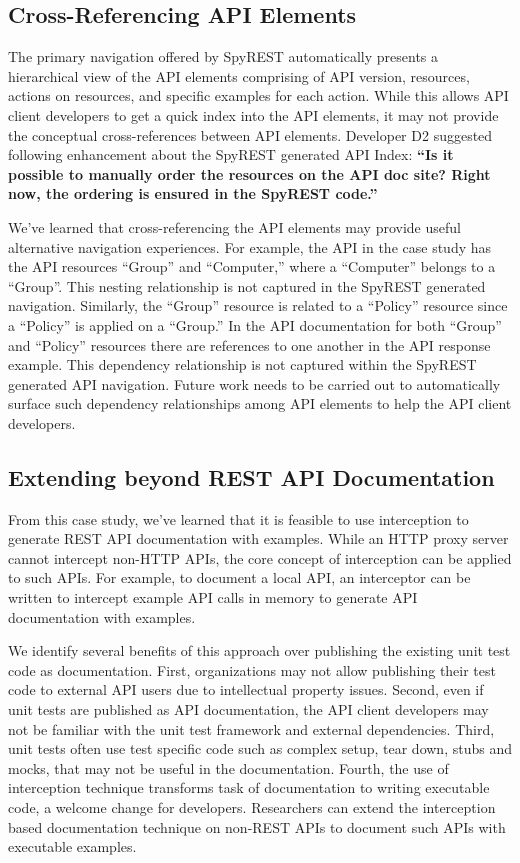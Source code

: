 \subsection{Cross-Referencing API Elements}
The primary navigation offered by SpyREST automatically presents a hierarchical view of the API elements comprising of API version, resources, actions on resources, and specific examples for each action. While this allows API client developers to get a quick index into the API elements, it may not provide the conceptual cross-references between API elements. Developer D2 suggested following enhancement about the SpyREST generated API Index: \textbf{``Is it possible to manually order the resources on the API doc site? Right now, the ordering is ensured in the SpyREST code.''}

We've learned that cross-referencing the API elements may provide useful alternative navigation experiences. For example, the API in the case study has the API resources ``Group'' and ``Computer,'' where a ``Computer'' belongs to a ``Group''. This nesting relationship is not captured in the SpyREST generated navigation. Similarly, the ``Group'' resource is related to a ``Policy'' resource since a ``Policy'' is applied on a ``Group.'' In the API documentation for both ``Group'' and ``Policy'' resources there are references to one another in the API response example. This dependency relationship is not captured within the SpyREST generated API navigation. Future work needs to be carried out to automatically surface such dependency relationships among API elements to help the API client developers.


\subsection{Extending beyond REST API Documentation}
From this case study, we've learned that it is feasible to use interception to generate REST API documentation with examples. While an HTTP proxy server cannot intercept non-HTTP APIs, the core concept of interception can be applied to such APIs. For example, to document a local API, an interceptor can be written to intercept example API calls in memory to generate API documentation with examples.

We identify several benefits of this approach over publishing the existing unit test code as documentation. First, organizations may not allow publishing their test code to external API users due to intellectual property issues. Second, even if unit tests are published as API documentation, the API client developers may not be familiar with the unit test framework and external dependencies. Third, unit tests often use test specific code such as complex setup, tear down, stubs and mocks, that may not be useful in the documentation. Fourth, the use of interception technique transforms task of documentation to writing executable code, a welcome change for developers. Researchers can extend the interception based documentation technique on non-REST APIs to document such APIs with executable examples.


